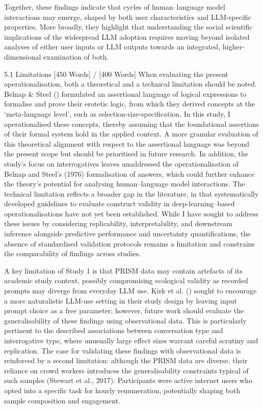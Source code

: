 \documentclass[
  12pt,
]{article}
\begin{document}
Together, these findings indicate that cycles of human--language model interactions may emerge, shaped by both user characteristics and LLM-specific properties. More broadly, they highlight that understanding the social scientific implications of the widespread LLM adoption requires moving beyond isolated analyses of either user inputs or LLM outputs towards an integrated, higher-dimensional examination of both.

5.1 Limitations {[}450 Words{]} / {[}400 Words{]}
When evaluating the present operationalisation, both a theoretical and a technical limitation should be noted. Belnap \& Steel () formulated an assertional language of logical expressions to formalise and prove their erotetic logic, from which they derived concepts at the `meta-language level', such as selection-size-specification. In this study, I operationalised these concepts, thereby assuming that the foundational assertions of their formal system hold in the applied context. A more granular evaluation of this theoretical alignment with respect to the assertional language was beyond the present scope but should be prioritised in future research. In addition, the study's focus on interrogatives leaves unaddressed the operationalisation of Belnap and Steel's (1976) formalisation of answers, which could further enhance the theory's potential for analysing human--language model interactions. The technical limitation reflects a broader gap in the literature, in that systematically developed guidelines to evaluate construct validity in deep-learning--based operationalisations have not yet been established. While I have sought to address these issues by considering replicability, interpretability, and downstream inference alongside predictive performance and uncertainty quantifications, the absence of standardised validation protocols remains a limitation and constrains the comparability of findings across studies.

A key limitation of Study 1 is that PRISM data may contain artefacts of its academic study context, possibly compromising ecological validity as recorded prompts may diverge from everyday LLM use. Kirk et al. () sought to encourage a more naturalistic LLM-use setting in their study design by leaving input prompt choice as a free parameter; however, future work should evaluate the generalisability of these findings using observational data. This is particularly pertinent to the described associations between conversation type and interrogative type, where unusually large effect sizes warrant careful scrutiny and replication. The case for validating these findings with observational data is reinforced by a second limitation: although the PRISM data are diverse, their reliance on crowd workers introduces the generalisability constraints typical of such samples (Stewart et al., 2017). Participants were active internet users who opted into a specific task for hourly remuneration, potentially shaping both sample composition and engagement.
\end{document}

